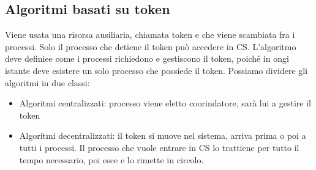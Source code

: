 \documentclass{article}
\begin{document}
\subsection{Algoritmi basati su token}
Viene usata una risorsa ausiliaria, chiamata token e che viene scambiata fra i processi. Solo il processo che detiene il token può accedere in CS. L'algoritmo deve definiee come i processi richiedono e gestiscono il token, poiché in ongi istante deve esistere un solo processo che possiede il token. Possiamo dividere gli algoritmi in due classi:
\begin{itemize}
\item Algoritmi centralizzati: processo viene eletto coorindatore, sarà lui a gestire il token
\item Algoritmi decentralizzati: il token si muove nel sistema, arriva prima o poi a tutti i processi. Il processo che vuole entrare in CS lo trattiene per tutto il tempo necessario, poi esce e lo rimette in circolo.
\end{itemize}
\end{document}
